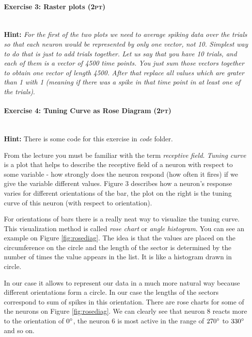 \documentclass[a4paper,11pt]{article}
\newenvironment{exercise}[3]{\paragraph{Exercise #1: #2 \textsc{(#3pt)}}\ \\}{
\medskip}
\begin{document}
\begin{exercise}{3}{Raster plots}{2}
\textbf{Hint: }\emph{For the first of the two plots we need to average spiking data over the trials so that each neuron would be represented by only one vector, not 10. Simplest way to do that is just to add trials together. Let us say that you have 10 trials, and each of them is a vector of 4500 time points. You just sum those vectors together to obtain one vector of length 4500. After that replace all values which are grater than 1 with 1 (meaning if there was a spike in that time point in at least one of the trials)}.

\end{exercise}


\begin{exercise}{4}{Tuning Curve as Rose Diagram}{2}

\textbf{Hint: } There is some code for this exercise in \emph{code} folder.

From the lecture you must be familiar with the term \emph{receptive field}. \emph{Tuning curve} is a plot that helps to describe the receptive field of a neuron with respect to some variable - how strongly does the neuron respond (how often it fires) if we give the variable different values. Figure 3 describes how a neuron's response varies for different orientations of the bar, the plot on the right is the tuning curve of this neuron (with respect to orientation).

For orientations of bars there is a really neat way to visualize the tuning curve. This visualization method is called \emph{rose chart} or \emph{angle histogram}. You can see an example on Figure \ref{fig:rosediag}. The idea is that the values are placed on the circumference on the circle and the length of the sector is determined by the number of times the value appears in the list. It is like a histogram drawn in circle.

In our case it allows to represent our data in a much more natural way because different orientations form a circle. In our case the lengths of the sectors correspond to sum of spikes in this orientation. There are rose charts for some of the neurons on Figure \ref{fig:rosediag}. We can clearly see that neuron 8 reacts more to the orientation of $0\degree$, the neuron 6 is most active in the range of $270\degree$ to $330\degree$ and so on.


\end{exercise}
\end{document}
